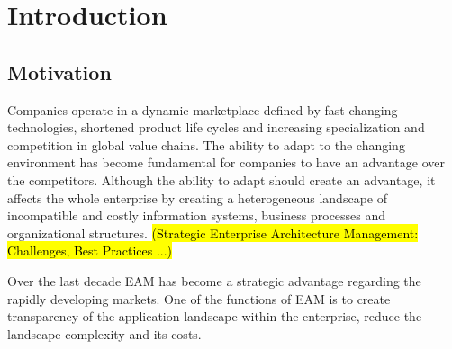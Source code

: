 
\chapter{Introduction}\label{chapter:introduction}


\section{Motivation}
Companies operate in a dynamic marketplace defined by fast-changing technologies, shortened product life cycles and increasing specialization and competition in global value chains. The ability to adapt to the changing environment has become fundamental for companies to have an advantage over the competitors. 
Although the ability to adapt should create an advantage, it affects the whole enterprise by creating a heterogeneous landscape of incompatible and costly information systems, business processes and organizational structures. \hl{(Strategic Enterprise Architecture Management: Challenges, Best Practices ...)}

Over the last decade EAM has become a strategic advantage regarding the rapidly developing markets. One of the functions of EAM is to create transparency of the application landscape within the enterprise, reduce the landscape complexity and its costs.

